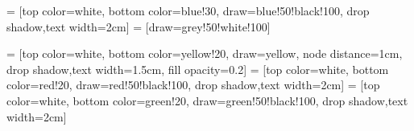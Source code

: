 \documentclass[../main.tex]{subfiles}
\begin{document}
\thispagestyle{empty}

 = [top color=white, bottom color=blue!30, 
                            draw=blue!50!black!100, drop shadow,text width=2cm]
 = [draw=grey!50!white!100]

 = [top color=white, bottom color=yellow!20, 
                               draw=yellow, node distance=1cm, drop shadow,text width=1.5cm, fill opacity=0.2]
 = [top color=white, bottom color=red!20, 
                                  draw=red!50!black!100, drop shadow,text width=2cm]
 = [top color=white, bottom color=green!20, 
                         draw=green!50!black!100, drop shadow,text width=2cm]
\end{document}
